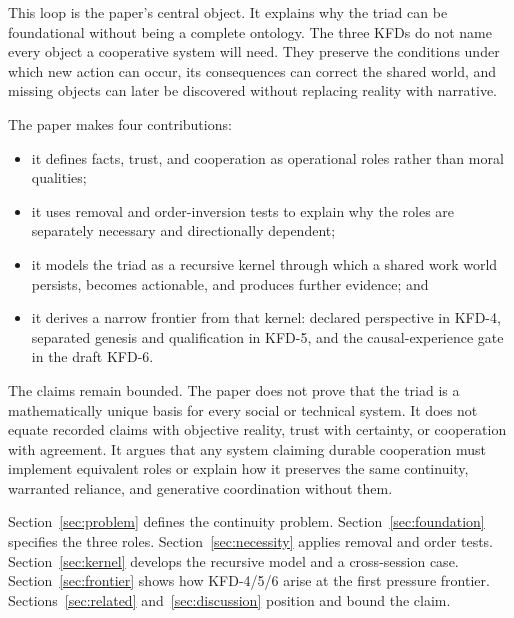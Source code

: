 This loop is the paper's central object. It explains why the triad can be
foundational without being a complete ontology. The three KFDs do not name
every object a cooperative system will need. They preserve the conditions
under which new action can occur, its consequences can correct the shared
world, and missing objects can later be discovered without replacing reality
with narrative.

The paper makes four contributions:

\begin{itemize}[leftmargin=*]
  \item it defines facts, trust, and cooperation as operational roles rather
        than moral qualities;
  \item it uses removal and order-inversion tests to explain why the roles are
        separately necessary and directionally dependent;
  \item it models the triad as a recursive kernel through which a shared work
        world persists, becomes actionable, and produces further evidence;
        and
  \item it derives a narrow frontier from that kernel: declared perspective
        in KFD-4, separated genesis and qualification in KFD-5, and the
        causal-experience gate in the draft KFD-6.
\end{itemize}

The claims remain bounded. The paper does not prove that the triad is a
mathematically unique basis for every social or technical system. It does not
equate recorded claims with objective reality, trust with certainty, or
cooperation with agreement. It argues that any system claiming durable
cooperation must implement equivalent roles or explain how it preserves the
same continuity, warranted reliance, and generative coordination without
them.

Section~\ref{sec:problem} defines the continuity problem.
Section~\ref{sec:foundation} specifies the three roles.
Section~\ref{sec:necessity} applies removal and order tests.
Section~\ref{sec:kernel} develops the recursive model and a cross-session
case. Section~\ref{sec:frontier} shows how KFD-4/5/6 arise at the first
pressure frontier. Sections~\ref{sec:related} and~\ref{sec:discussion}
position and bound the claim.
